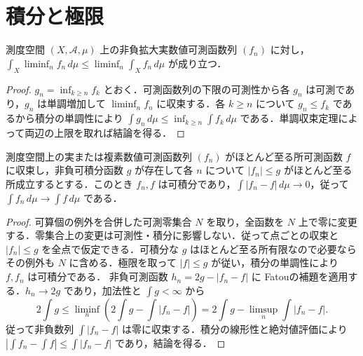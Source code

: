 \section{積分と極限}
\begin{prop}[Fatouの補題]
測度空間 $(X,\mathcal A,\mu)$ 上の非負拡大実数値可測函数列 $(f_n)$ に対し，$\int_X\liminf_n f_n\,d\mu\leq\liminf_n\int_X f_n\,d\mu$ が成り立つ．
\end{prop}
\begin{proof}
$g_n=\inf_{k\geq n}f_k$ とおく．可測函数列の下限の可測性から各 $g_n$ は可測であり，$g_n$ は単調増加して $\liminf_n f_n$ に収束する．各 $k\geq n$ について $g_n\leq f_k$ であるから積分の単調性により $\int g_n\,d\mu\leq\inf_{k\geq n}\int f_k\,d\mu$ である．単調収束定理によって両辺の上限を取れば結論を得る．
\end{proof}
\begin{prop}[Lebesgueの優収束定理]
測度空間上の実または複素数値可測函数列 $(f_n)$ がほとんど至る所可測函数 $f$ に収束し，非負可積分函数 $g$ が存在して各 $n$ について $|f_n|\leq g$ がほとんど至る所成立するとする．このとき $f_n,f$ は可積分であり，$\int |f_n-f|\,d\mu\to0$，従って $\int f_n\,d\mu\to\int f\,d\mu$ である．
\end{prop}
\begin{proof}
可算個の例外を合併した可測零集合 $N$ を取り，全函数を $N$ 上で零に変更する．零集合上の変更は可測性・積分に影響しない．従って点ごとの収束と $|f_n|\leq g$ を全点で仮定できる．可積分な $g$ はほとんど至る所有限なので必要ならその例外も $N$ に含める．極限を取って $|f|\leq g$ が従い，積分の単調性により $f,f_n$ は可積分である．
非負可測函数 $h_n=2g-|f_n-f|$ に Fatouの補題を適用する．$h_n\to2g$ であり，加法性と $\int g<\infty$ から
\[
2\int g\leq\liminf_n\left(2\int g-\int |f_n-f|\right)
=2\int g-\limsup_n\int|f_n-f|.
\]
従って非負数列 $\int|f_n-f|$ は零に収束する．積分の線形性と絶対値評価により $|\int f_n-\int f|\leq\int|f_n-f|$ であり，結論を得る．
\end{proof}
